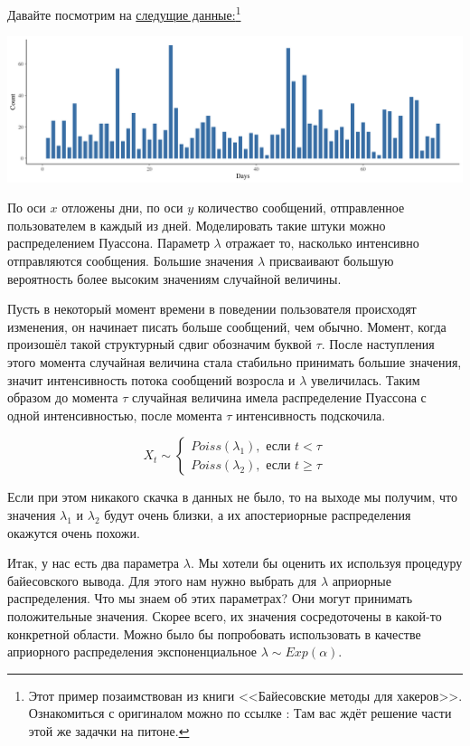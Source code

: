 \documentclass[12pt, a4paper, oneside]{extreport}
\theoremstyle{plain}              %
\theoremstyle{definition}         %
\begin{document}
Давайте посмотрим на \href{https://raw.githubusercontent.com/FUlyankin/bayes_book/master/itog_scripts/poisson_shift/message.csv}{следущие данные:}\footnote{Этот пример позаимствован из книги <<Байесовские методы для хакеров>>. Ознакомиться с оригиналом можно по ссылке : \url{ } Там вас ждёт решение части этой же задачки на питоне.}

\begin{center}
\includegraphics[scale=0.35]{poisson_shift1.png}
\end{center} 

По оси $x$ отложены дни, по оси $y$ количество сообщений, отправленное пользователем в каждый из дней.  Моделировать такие штуки можно распределением Пуассона. Параметр $\lambda$ отражает то, насколько интенсивно отправляются сообщения. Большие значения $\lambda$ присваивают большую вероятность более высоким значениям случайной величины. 

Пусть в некоторый момент времени в поведении пользователя происходят изменения, он начинает писать больше сообщений, чем обычно. Момент, когда произошёл такой структурный сдвиг обозначим буквой $\tau$. После наступления этого момента случайная величина стала стабильно принимать большие значения, значит интенсивность потока сообщений возросла и $\lambda$ увеличилась. Таким образом до момента $\tau$ случайная величина имела распределение Пуассона с одной интенсивностью, после момента $\tau$ интенсивность подскочила. 

\begin{equation*}
X_t \sim \begin{cases}  Poiss(\lambda_1), \text{ если } t < \tau \\  Poiss(\lambda_2), \text{ если } t \ge \tau \end{cases}
\end{equation*}

Если при этом никакого скачка в данных не было, то на выходе мы получим, что значения $\lambda_1$ и $\lambda_2$ будут очень близки, а их апостериорные распределения окажутся очень похожи. 

Итак, у нас есть два параметра $\lambda$. Мы хотели бы оценить их используя процедуру байесовского вывода. Для этого нам нужно выбрать для $\lambda$ априорные распределения. Что мы знаем об этих параметрах? Они могут принимать положительные значения. Скорее всего, их значения сосредоточены в какой-то конкретной области. Можно было бы попробовать использовать в качестве априорного распределения экспоненциальное $\lambda \sim Exp(\alpha)$. 
\end{document}
